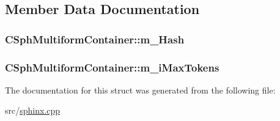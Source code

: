 \subsection{Member Data Documentation}
\hypertarget{structCSphMultiformContainer_a14fda72f24a518e5b380946bcf32dcb4}{
\subsubsection[{m\-\_\-\-Hash}]{ C\-Sph\-Multiform\-Container\-::m\-\_\-\-Hash}}\label{structCSphMultiformContainer_a14fda72f24a518e5b380946bcf32dcb4}
\hypertarget{structCSphMultiformContainer_add26576ea112a036f883aa88e5b8e8cd}{
\subsubsection[{m\-\_\-i\-Max\-Tokens}]{ C\-Sph\-Multiform\-Container\-::m\-\_\-i\-Max\-Tokens}}\label{structCSphMultiformContainer_add26576ea112a036f883aa88e5b8e8cd}


The documentation for this struct was generated from the following file\-:\begin{DoxyCompactItemize}
\item 
src/\hyperlink{sphinx_8cpp}{sphinx.\-cpp}\end{DoxyCompactItemize}
